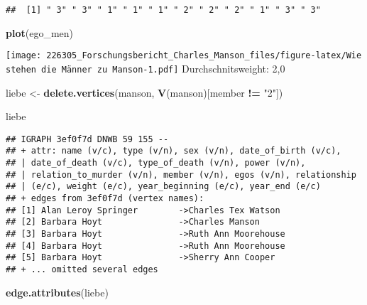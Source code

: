 \documentclass[
]{article}
\newenvironment{Shaded}{\begin{snugshade}}{\end{snugshade}}
\newcommand{\KeywordTok}[1]{\textcolor[rgb]{0.13,0.29,0.53}{\textbf{#1}}}
\newcommand{\NormalTok}[1]{#1}
\newcommand{\OperatorTok}[1]{\textcolor[rgb]{0.81,0.36,0.00}{\textbf{#1}}}
\newcommand{\StringTok}[1]{\textcolor[rgb]{0.31,0.60,0.02}{#1}}
\begin{document}
\begin{verbatim}
##  [1] " 3" " 3" " 1" " 1" " 1" " 2" " 2" " 2" " 1" " 3" " 3"
\end{verbatim}

\begin{Shaded}
\begin{Highlighting}[]
\KeywordTok{plot}\NormalTok{(ego_men)}
\end{Highlighting}
\end{Shaded}

\texttt{[image: 226305\_Forschungsbericht\_Charles\_Manson\_files/figure-latex/Wie stehen die Männer zu Manson-1.pdf]}
Durchschnitsweight: 2,0

\begin{Shaded}
\begin{Highlighting}[]
\NormalTok{liebe <-}\StringTok{ }\KeywordTok{delete.vertices}\NormalTok{(manson, }\KeywordTok{V}\NormalTok{(manson)[member }\OperatorTok{!=}\StringTok{ "2"}\NormalTok{])}

\NormalTok{liebe}
\end{Highlighting}
\end{Shaded}

\begin{verbatim}
## IGRAPH 3ef0f7d DNWB 59 155 -- 
## + attr: name (v/c), type (v/n), sex (v/n), date_of_birth (v/c),
## | date_of_death (v/c), type_of_death (v/n), power (v/n),
## | relation_to_murder (v/n), member (v/n), egos (v/n), relationship
## | (e/c), weight (e/c), year_beginning (e/c), year_end (e/c)
## + edges from 3ef0f7d (vertex names):
## [1] Alan Leroy Springer        ->Charles Tex Watson 
## [2] Barbara Hoyt               ->Charles Manson     
## [3] Barbara Hoyt               ->Ruth Ann Moorehouse
## [4] Barbara Hoyt               ->Ruth Ann Moorehouse
## [5] Barbara Hoyt               ->Sherry Ann Cooper  
## + ... omitted several edges
\end{verbatim}

\begin{Shaded}
\begin{Highlighting}[]
\KeywordTok{edge.attributes}\NormalTok{(liebe)}
\end{Highlighting}
\end{Shaded}
\end{document}
